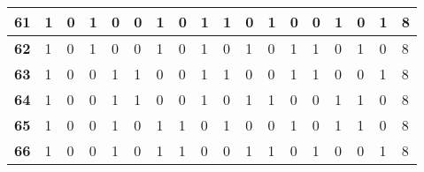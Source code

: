 \begin{table}[h!]
{\begin{tabular}{|P{0.6cm}|P{0.65cm}|P{0.65cm}|P{0.65cm}|P{0.65cm}|P{0.65cm}|P{0.65cm}|P{0.65cm}|P{0.65cm}|P{0.65cm}|P{0.65cm}|P{0.65cm}|P{0.65cm}|P{0.65cm}|P{0.65cm}|P{0.65cm}|P{0.65cm}|P{2.9cm}|}
\textbf{61}                        & 1                     & 0                     & 1                     & 0                     & 0                     & 1                     & 0                     & 1                     & 1                     & 0                     & 1                     & 0                     & 0                     & 1                     & 0                     & 1                     & 8                     \\ \hline
\textbf{62}                        & 1                     & 0                     & 1                     & 0                     & 0                     & 1                     & 0                     & 1                     & 0                     & 1                     & 0                     & 1                     & 1                     & 0                     & 1                     & 0                     & 8                     \\ \hline
\textbf{63}                        & 1                     & 0                     & 0                     & 1                     & 1                     & 0                     & 0                     & 1                     & 1                     & 0                     & 0                     & 1                     & 1                     & 0                     & 0                     & 1                     & 8                     \\ \hline
\textbf{64}                        & 1                     & 0                     & 0                     & 1                     & 1                     & 0                     & 0                     & 1                     & 0                     & 1                     & 1                     & 0                     & 0                     & 1                     & 1                     & 0                     & 8                     \\ \hline
\textbf{65}                        & 1                     & 0                     & 0                     & 1                     & 0                     & 1                     & 1                     & 0                     & 1                     & 0                     & 0                     & 1                     & 0                     & 1                     & 1                     & 0                     & 8                     \\ \hline
\textbf{66}                        & 1                     & 0                     & 0                     & 1                     & 0                     & 1                     & 1                     & 0                     & 0                     & 1                     & 1                     & 0                     & 1                     & 0                     & 0                     & 1                     & 8                     \\ \hline

\end{tabular}}
\end{table}
